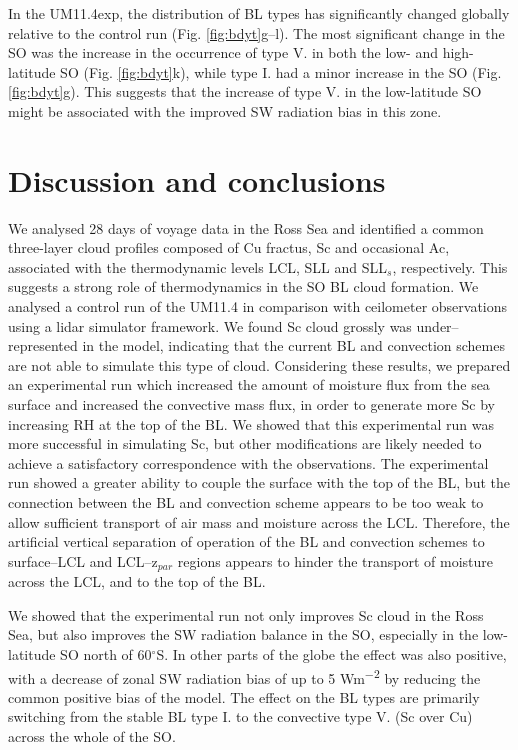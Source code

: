 
In the UM11.4exp, the distribution of BL types has significantly changed
globally relative to the control run (Fig. \ref{fig:bdyt}g--l). The most significant change in the SO
was the increase in the occurrence of type V. in both the low- and high-latitude SO (Fig.
\ref{fig:bdyt}k), while type I. had a minor increase in the SO (Fig.
\ref{fig:bdyt}g). This suggests that the increase of type V. in the low-latitude
SO might be associated with the improved SW radiation bias in this zone.

\section{Discussion and conclusions}
\label{sec:conclusions}

We analysed 28 days of voyage data in the Ross Sea and identified a common
three-layer cloud profiles composed of Cu fractus, Sc and occasional
Ac, associated with the thermodynamic levels LCL, SLL and SLL$_s$, respectively.
This suggests a strong role of thermodynamics in the SO BL cloud formation.
We analysed a control run of the UM11.4 in comparison with ceilometer
observations using a lidar simulator framework. We found Sc cloud grossly
was under--represented in the model, indicating that the current BL and convection
schemes are not able to simulate this type of cloud. Considering these results,
we prepared an experimental run which increased the amount of moisture flux
from the sea surface and increased the convective mass flux, in order to
generate more Sc by increasing RH at the top of the BL. We showed that this
experimental run was more successful in simulating Sc, but other
modifications are likely needed to achieve a satisfactory correspondence with
the observations. The experimental run showed a greater ability to couple the
surface with the top of the BL, but the connection between the BL and convection
scheme appears to be too weak to allow sufficient transport of air mass and
moisture across the LCL. Therefore, the artificial vertical separation of operation of the
BL and convection schemes to surface--LCL and LCL--z$_{par}$ regions appears
to hinder the transport of moisture across the LCL, and to the top of the BL.

We showed that the experimental run not only improves Sc cloud in the Ross Sea,
but also improves the SW radiation balance in the SO, especially in the
low-latitude SO north of 60$^\circ$S. In other parts of the globe the effect was
also positive, with a decrease of zonal SW radiation bias of up to 5
\unit{Wm^{-2}} by reducing the common positive bias of the model. The
effect on the BL types are primarily switching from the stable BL type I.
to the convective type V. (Sc over Cu) across the whole of the SO.

